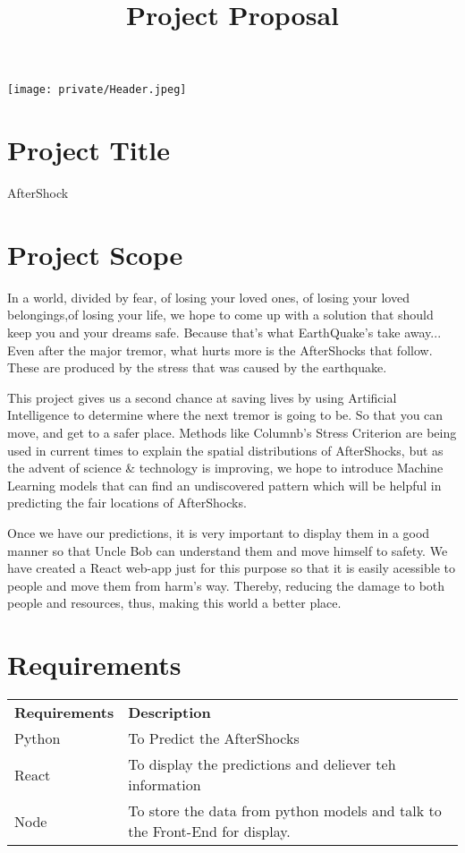\documentclass{article}
\title{Project Proposal}
\author{}
\date{}
\begin{document}
\texttt{[image: private/Header.jpeg]}
\vspace{3em}

\section{Project Title}

\Large{AfterShock}

\section{Project Scope}

In a world, divided by fear, of losing your loved ones, of losing your loved belongings,of losing your life, we hope to come up with a solution that should keep you and your dreams safe. Because that's what EarthQuake's take away... Even after the major tremor, what hurts more is the AfterShocks that follow. These are produced by the stress that was caused by the earthquake.

This project gives us a second chance at saving lives by using Artificial Intelligence to determine where the next tremor is going to be. So that you can move, and get to a safer place. Methods like Columnb's Stress Criterion are being used in current times to explain the spatial distributions of AfterShocks, but as the advent of science \& technology is improving, we hope to introduce Machine Learning models that can find an undiscovered pattern which will be helpful in predicting the fair locations of AfterShocks.

Once we have our predictions, it is very important to display them in a good manner so that Uncle Bob can understand them and move himself to safety. We have created a React web-app just for this purpose so that it is easily acessible to people and move them from harm's way. Thereby, reducing the damage to both people and resources, thus, making this world a better place.

\section{Requirements}

\begin{tabular}{ll}
\textbf{Requirements} & \textbf{Description} \\
Python & To Predict the AfterShocks \\
React & To display the predictions and deliever teh information \\
Node & To store the data from python models and talk to the Front-End for display.\\
\end{tabular}
\end{document}
